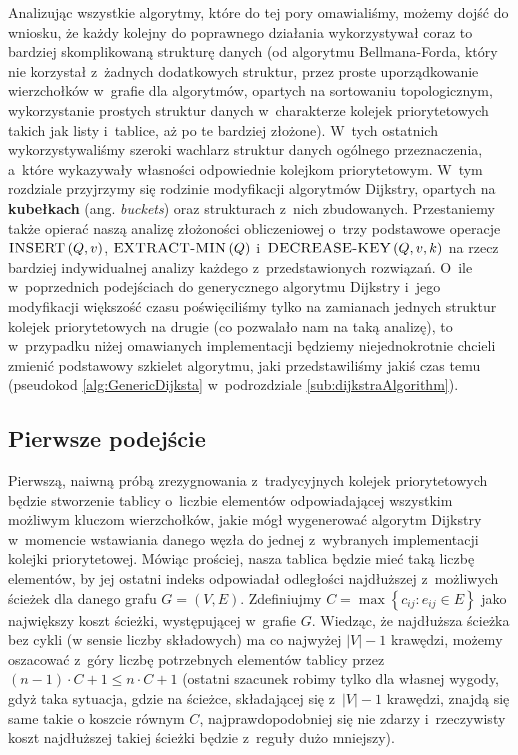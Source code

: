 Analizując wszystkie algorytmy, które do tej pory omawialiśmy, możemy dojść do wniosku, że każdy kolejny do poprawnego działania wykorzystywał coraz to bardziej skomplikowaną strukturę danych (od algorytmu Bellmana-Forda, który nie korzystał z~żadnych dodatkowych struktur, przez proste uporządkowanie wierzchołków w~grafie dla algorytmów, opartych na sortowaniu topologicznym, wykorzystanie prostych struktur danych w~charakterze kolejek priorytetowych takich jak listy i~tablice, aż po te bardziej złożone). W~tych ostatnich wykorzystywaliśmy szeroki wachlarz struktur danych ogólnego przeznaczenia, a~które wykazywały własności odpowiednie kolejkom priorytetowym. W~tym rozdziale przyjrzymy się rodzinie modyfikacji algorytmów Dijkstry, opartych na \textbf{kubełkach} (ang. \textit{buckets}) oraz strukturach z~nich zbudowanych. Przestaniemy także opierać naszą analizę złożoności obliczeniowej o~trzy podstawowe operacje $\textrm{\textsc{INSERT}} \left( Q, v \right)$, $\textrm{\textsc{EXTRACT-MIN}} \left( Q \right)$ i~$\textrm{\textsc{DECREASE-KEY}} \left( Q, v, k \right)$ na rzecz bardziej indywidualnej analizy każdego z~przedstawionych rozwiązań. O~ile w~poprzednich podejściach do  generycznego algorytmu Dijkstry i~jego modyfikacji większość czasu poświęciliśmy tylko na zamianach jednych struktur kolejek priorytetowych na drugie (co pozwalało nam na taką analizę), to w~przypadku niżej omawianych implementacji będziemy niejednokrotnie chcieli zmienić podstawowy szkielet algorytmu, jaki przedstawiliśmy jakiś czas temu (pseudokod \ref{alg:GenericDijksta} w~podrozdziale \ref{sub:dijkstraAlgorithm}).

\subsection{Pierwsze podejście}

Pierwszą, naiwną próbą zrezygnowania z~tradycyjnych kolejek priorytetowych będzie stworzenie tablicy o~liczbie elementów odpowiadającej wszystkim możliwym kluczom wierzchołków, jakie mógł wygenerować algorytm Dijkstry w~momencie wstawiania danego węzła do jednej z~wybranych implementacji kolejki priorytetowej. Mówiąc prościej, nasza tablica będzie mieć taką liczbę elementów, by jej ostatni indeks odpowiadał odległości najdłuższej z~możliwych ścieżek dla danego grafu $G = \left( V, E \right)$. Zdefiniujmy $C = \max \left\{ c_{ij} : e_{ij} \in E \right\}$ jako największy koszt ścieżki, występującej w~grafie $G$. Wiedząc, że najdłuższa ścieżka bez cykli (w sensie liczby składowych) ma co najwyżej $ \left| V \right| - 1 $ krawędzi, możemy oszacować z~góry liczbę potrzebnych elementów tablicy przez $ \left( n - 1 \right) \cdot C + 1 \leqslant n \cdot C + 1$ (ostatni szacunek robimy tylko dla własnej wygody, gdyż taka sytuacja, gdzie na ścieżce, składającej się z~$ \left| V \right| - 1 $ krawędzi, znajdą się same takie o koszcie równym $C$, najprawdopodobniej się nie zdarzy i~rzeczywisty koszt najdłuższej takiej ścieżki będzie z~reguły dużo mniejszy).


